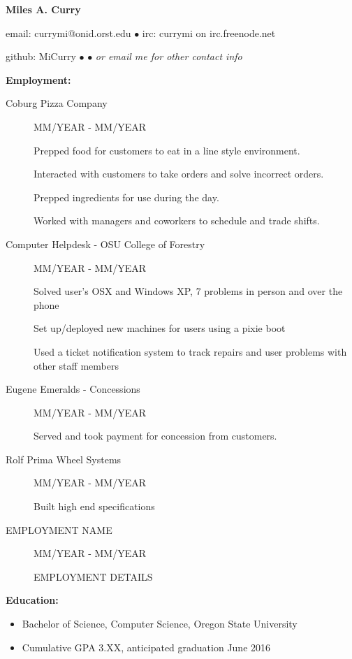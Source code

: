 \documentclass[11pt]{article}
\begin{document}
\centerline{{\LARGE \bf Miles A. Curry}}

\bigskip

\centerline{email: currymi@onid.orst.edu
        $\bullet$
        irc: currymi on irc.freenode.net}
\centerline{github: MiCurry
        $\bullet$
        $\bullet$
        \emph{or email me for other contact info}}

\bigskip
\hrulefill
\bigskip

{\Large \bf Employment:}
\begin{description}

\item[Coburg Pizza Company]
    \hfill MM/YEAR - MM/YEAR

    Prepped food for customers to eat in a line style environment.

    Interacted with customers to take orders and solve incorrect orders.

    Prepped ingredients for use during the day.

    Worked with managers and coworkers to schedule and trade shifts.

\item[Computer Helpdesk - OSU College of Forestry]
    \hfill MM/YEAR - MM/YEAR

    Solved user's OSX and Windows XP, 7 problems in person and over the phone

    Set up/deployed new machines for users using a pixie boot

    Used a ticket notification system to track repairs and user problems
    with other staff members


\item[Eugene Emeralds - Concessions]
    \hfill MM/YEAR - MM/YEAR

    Served and took payment for concession from customers.

\item[Rolf Prima Wheel Systems]
    \hfill MM/YEAR - MM/YEAR

    Built high end specifications

\item[EMPLOYMENT NAME]
    \hfill MM/YEAR - MM/YEAR
       
     EMPLOYMENT DETAILS

\end{description}

\smallskip
\hrulefill
\bigskip

{\Large \bf Education:}
\begin{itemize}
    \setlength{\itemsep}{1pt}
    \setlength{\parskip}{0pt}
    \setlength{\parsep}{0pt}

    \item Bachelor of Science, Computer Science, Oregon State University
    \item Cumulative GPA 3.XX, anticipated graduation June 2016

\end{itemize}
\end{document}
